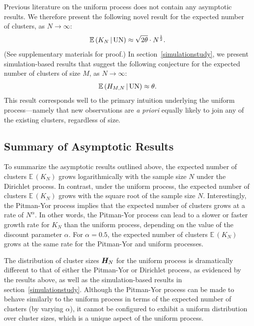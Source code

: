 \documentclass{article}
\begin{document}
Previous literature on the uniform process does not contain any
asymptotic results.  We therefore present the following novel result
for the expected number of clusters, as $N \to \infty$:
\begin{equation}
\mathbb{E}\,(K_N\,|\,{\rm UN}) \approx \sqrt{2 \theta} \cdot
N^{\frac{1}{2}}. \label{UNmom2}
\end{equation}
(See supplementary materials for proof.) In
section~\ref{simulationstudy}, we present simulation-based results
that suggest the following conjecture for the expected number of
clusters of size $M$, as $N \to \infty$:
\begin{equation}
\mathbb{E}\,(H_{M,N} \,|\, {\rm UN}) \approx \theta.  \label{UNmom4}
\end{equation}
This result corresponds well to the primary intuition underlying the
uniform process---namely that new observations are \emph{a priori} equally
likely to join any of the existing clusters, regardless of size.

\subsection{Summary of Asymptotic Results}

To summarize the asymptotic results outlined above, the expected
number of clusters $\mathbb{E}\,(K_N)$ grows logarithmically with the
sample size $N$ under the Dirichlet process. In contrast, under the
uniform process, the expected number of clusters $\mathbb{E}\,(K_N)$
grows with the square root of the sample size $N$. Interestingly, the
Pitman-Yor process implies that the expected number of clusters grows
at a rate of $N^\alpha$. In other words, the Pitman-Yor process can
lead to a slower or faster growth rate for $K_N$ than the uniform
process, depending on the value of the discount parameter
$\alpha$. For $\alpha = 0.5$, the expected number of clusters
$\mathbb{E}\,(K_N)$ grows at the same rate for the Pitman-Yor and
uniform processes.

The distribution of cluster sizes $\boldsymbol{H}_N$ for the uniform process is
dramatically different to that of either the Pitman-Yor or Dirichlet
process, as evidenced by the results above, as well as the
simulation-based results in section~\ref{simulationstudy}. Although
the Pitman-Yor process can be made to behave similarly to the uniform
process in terms of the expected number of clusters (by varying
$\alpha$), it cannot be configured to exhibit a uniform distribution
over cluster sizes, which is a unique aspect of the uniform process.
\end{document}
